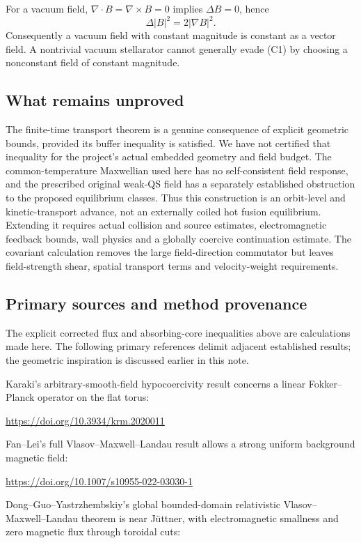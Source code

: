 For a vacuum field, \(\nabla\cdot B=\nabla\times B=0\) implies
\(\Delta B=0\), hence \[
\Delta |B|^2=2|\nabla B|^2.
\] Consequently a vacuum field with constant magnitude is constant as a
vector field. A nontrivial vacuum stellarator cannot generally evade
(C1) by choosing a nonconstant field of constant magnitude.

\subsection{What remains unproved}\label{what-remains-unproved}

The finite-time transport theorem is a genuine consequence of explicit
geometric bounds, provided its buffer inequality is satisfied. We have
not certified that inequality for the project's actual embedded geometry
and field budget. The common-temperature Maxwellian used here has no
self-consistent field response, and the prescribed original weak-QS
field has a separately established obstruction to the proposed
equilibrium classes. Thus this construction is an orbit-level and
kinetic-transport advance, not an externally coiled hot fusion
equilibrium. Extending it requires actual collision and source
estimates, electromagnetic feedback bounds, wall physics and a globally
coercive continuation estimate. The covariant calculation removes the
large field-direction commutator but leaves field-strength shear,
spatial transport terms and velocity-weight requirements.

\subsection{Primary sources and method
provenance}\label{primary-sources-and-method-provenance}

The explicit corrected flux and absorbing-core inequalities above are calculations made here. The following primary references delimit adjacent established results; the geometric inspiration is discussed earlier in this note.

Karaki's arbitrary-smooth-field hypocoercivity result concerns a linear
Fokker--Planck operator on the flat torus:

\url{https://doi.org/10.3934/krm.2020011}

Fan--Lei's full Vlasov--Maxwell--Landau result allows a strong uniform
background magnetic field:

\url{https://doi.org/10.1007/s10955-022-03030-1}

Dong--Guo--Yastrzhembskiy's global bounded-domain relativistic
Vlasov--Maxwell--Landau theorem is near Jüttner, with electromagnetic
smallness and zero magnetic flux through toroidal cuts:

